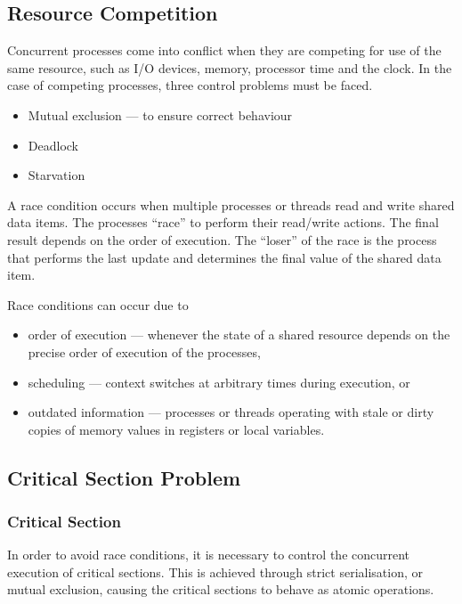 \subsection{Resource Competition}

Concurrent processes come into conflict when they are competing for use of the same resource, such as I/O devices, memory, processor time and the clock.
In the case of competing processes, three control problems must be faced.
\begin{itemize}
  \item Mutual exclusion --- to ensure correct behaviour
  \item Deadlock
  \item Starvation
\end{itemize}

A race condition occurs when multiple processes or threads read and write shared data items.
The processes ``race'' to perform their read/write actions.
The final result depends on the order of execution.
The ``loser'' of the race is the process that performs the last update and determines the final value of the shared data item.

Race conditions can occur due to
\begin{itemize}
  \item order of execution --- whenever the state of a shared resource depends on the precise order of execution of the processes,
  \item scheduling --- context switches at arbitrary times during execution, or
  \item outdated information --- processes or threads operating with stale or dirty copies of memory values in registers or local variables.
\end{itemize}

\subsection{Critical Section Problem}

\subsubsection{Critical Section}

In order to avoid race conditions, it is necessary to control the concurrent execution of critical sections.
This is achieved through strict serialisation, or mutual exclusion, causing the critical sections to behave as atomic operations.

